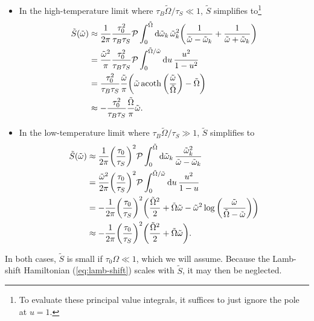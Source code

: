\documentclass[../thesis.tex]{subfiles}
\begin{document}
\begin{itemize}
  \item In the high-temperature limit where $\tau_B\tilde{\Omega} / \tau_S \ll
    1$, $\tilde{S}$ simplifies to\footnote{%
      To evaluate these principal value integrals, it suffices to just ignore
      the pole at $u = 1$.
    }
    \begin{align}
      \tilde{S}(\tilde{\omega})
      &\approx \frac{1}{2\pi} \frac{\tau_0^2}{\tau_B\tau_S}
      \pv\int_0^{\tilde{\Omega}} \dd{\tilde{\omega}_k} \tilde{\omega}_k^2
      \qty(\frac{1}{\tilde{\omega} - \tilde{\omega}_k}
      + \frac{1}{\tilde{\omega} + \tilde{\omega}_k}) \\
      &= \frac{\tilde{\omega}^2}{\pi} \frac{\tau_0^2}{\tau_B\tau_S}
      \pv\int_0^{\tilde{\Omega} / \tilde{\omega}} \dd{u}
      \frac{u^2}{1 - u^2} \\
      &= \frac{\tau_0^2}{\tau_B\tau_S} \frac{\tilde{\omega}}{\pi}
      \qty(\tilde{\omega}\acoth\qty(\frac{\tilde{\omega}}{\tilde{\Omega}})
      - \tilde{\Omega}) \\
      &\approx -\frac{\tau_0^2}{\tau_B\tau_S}
      \frac{\tilde{\Omega}}{\pi}\tilde{\omega}.
    \end{align}

  \item In the low-temperature limit where $\tau_B\tilde{\Omega} / \tau_S \gg
    1$, $\tilde{S}$ simplifies to
    \begin{align}
      \tilde{S}(\tilde{\omega})
      &\approx \frac{1}{2\pi} {\qty(\frac{\tau_0}{\tau_S})}^2
      \pv\int_0^{\tilde{\Omega}} \dd{\tilde{\omega}_k}
      \frac{\tilde{\omega}_k^2}{\tilde{\omega} - \tilde{\omega}_k} \\
      &= \frac{\tilde{\omega}^2}{2\pi} {\qty(\frac{\tau_0}{\tau_S})}^2
      \pv\int_0^{\tilde{\Omega} / \tilde{\omega}} \dd{u}
      \frac{u^2}{1 - u} \\
      &= -\frac{1}{2\pi} {\qty(\frac{\tau_0}{\tau_S})}^2 \qty(%
      \frac{\tilde{\Omega}^2}{2} + \tilde{\Omega}\tilde{\omega} -
      \tilde{\omega}^2
      \log\qty(\frac{\tilde{\omega}}{\tilde{\Omega} - \tilde{\omega}})
      ) \\
      &\approx -\frac{1}{2\pi} {\qty(\frac{\tau_0}{\tau_S})}^2 \qty(%
      \frac{\tilde{\Omega}^2}{2} + \tilde{\Omega}\tilde{\omega}
      ).
    \end{align}
\end{itemize}
In both cases, $\tilde{S}$ is small if $\tau_0\Omega \ll 1$, which we will
assume. Because the Lamb-shift Hamiltonian (\cref{eq:lamb-shift}) scales with
$\tilde{S}$, it may then be neglected.
\end{document}
